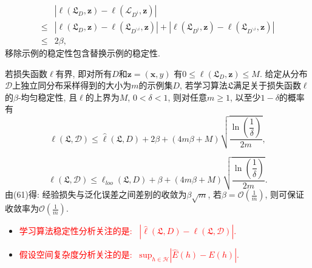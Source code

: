 \begin{equation}
\begin{aligned}
&\left| \ell \left( \mathfrak{L}_D,\boldsymbol{z} \right) -\ell \left( \mathcal{L}_{D^i},\boldsymbol{z} \right) \right| \\
\le &\left| \ell \left( \mathfrak{L}_D,\boldsymbol{z} \right) -\ell \left( \mathfrak{L}_{D^{\backslash i}},\boldsymbol{z} \right) \right|+\left| \ell \left( \mathfrak{L}_{D^i},\boldsymbol{z} \right) -\ell \left( \mathfrak{L}_{D^{\backslash i}},\boldsymbol{z} \right) \right|\\
\le &  2\beta ,
\end{aligned}
\end{equation}
移除示例的稳定性包含替换示例的稳定性. 
\begin{theorem}\label{thm:8}
若损失函数$\ell$有界, 即对所有$D$和$\boldsymbol{z}=\left( \boldsymbol{x}, y \right) $ 有$0\le \ell \left( \mathfrak{L}_D,\boldsymbol{z} \right) \le M$. 给定从分布$\mathcal{D}$上独立同分布采样得到的大小为$m$的示例集$D$, 若学习算法$\mathfrak{L}$满足关于损失函数$\ell$的$\beta$-均匀稳定性, 且$\ell$的上界为$M$, $0<\delta<1$, 则对任意$m\ge 1$, 以至少$1-\delta$的概率有
\begin{equation}
\ell \left( \mathfrak{L},\mathcal{D} \right) \le \hat{\ell}\left( \mathfrak{L},D \right) +2\beta +\left( 4m\beta +M \right) \sqrt{\frac{\ln \left( \dfrac{1}{\delta} \right)}{2m}},
\end{equation}

\begin{equation}
 \ell \left( \mathfrak{L},\mathcal{D} \right) \le \ell _{loo}\left( \mathfrak{L},D \right) +\beta +\left( 4m\beta +M \right) \sqrt{\frac{\ln \left( \dfrac{1}{\delta} \right)}{2m}}.
\end{equation}
由(61)得: 经验损失与泛化误差之间差别的收敛为$\beta \sqrt{m}$, 若$\beta =\mathcal{O}\left( \frac{1}{m} \right) $, 则可保证收敛率为$\mathcal{O}\left( \frac{1}{m} \right)$. 
\end{theorem}

\begin{itemize}
  \item \textcolor{red}{学习算法稳定性分析关注的是: \ $\left| \hat{\ell}\left( \mathfrak{L},D \right) -\ell \left( \mathfrak{L},\mathcal{D} \right) \right|$.}
 \item \textcolor{red}{假设空间复杂度分析关注的是: \ $\text{sup}_{h\in \mathcal{H}}\left| \widehat{E}\left( h \right) -E\left( h \right) \right|$.}
\end{itemize}


